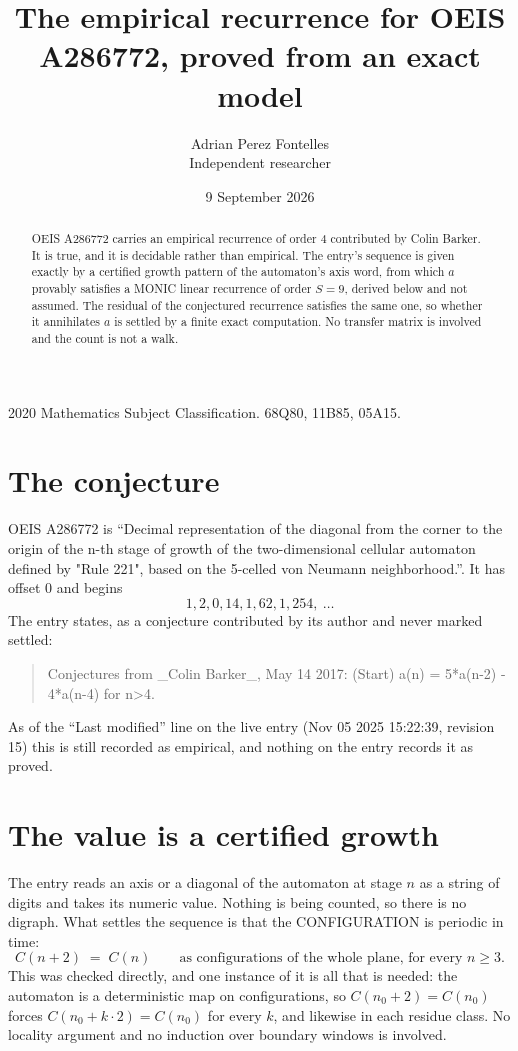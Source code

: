 \documentclass[11pt,a4paper]{article}
\title{The empirical recurrence for OEIS A286772, proved from an exact model}
\author{Adrian Perez Fontelles\\ \small Independent researcher}
\date{9 September 2026}
\theoremstyle{plain}
\theoremstyle{definition}
\begin{document}
\maketitle

\begin{abstract}
OEIS A286772 carries an empirical recurrence of order $4$ contributed by Colin Barker. It is true, and it is
decidable rather than empirical. The entry's sequence is given exactly by a certified growth pattern of the automaton's axis word, from
which $a$ provably satisfies a MONIC linear recurrence of order $S=9$, derived below and not
assumed. The residual of the conjectured recurrence satisfies the same one, so whether it
annihilates $a$ is settled by a finite exact computation. No transfer matrix is involved and
the count is not a walk.
\end{abstract}

\noindent\small 2020 Mathematics Subject Classification. 68Q80, 11B85, 05A15.\normalsize

\section{The conjecture}

OEIS A286772 is ``Decimal representation of the diagonal from the corner to the origin of the n-th stage of growth of the two-dimensional cellular automaton defined by "Rule 221", based on the 5-celled von Neumann neighborhood.''. It has offset $0$ and begins
\[
1, 2, 0, 14, 1, 62, 1, 254,\ \dots
\]
The entry states, as a conjecture contributed by its author and never marked settled:
\begin{quote}
Conjectures from \_Colin Barker\_, May 14 2017: (Start) a(n) = 5*a(n-2) - 4*a(n-4) for n>4.
\end{quote}
As of the ``Last modified'' line on the live entry (Nov 05 2025 15:22:39, revision 15)
this is still recorded as empirical, and nothing on the entry records it as proved.

\section{The value is a certified growth}

The entry reads an axis or a diagonal of the automaton at stage $n$ as a string of digits and
takes its numeric value. Nothing is being counted, so there is no digraph. What settles the
sequence is that the CONFIGURATION is periodic in time:
\[
C(n+2)\;=\;C(n)\qquad\text{as configurations of the whole plane, for every } n\ge 3.
\]
This was checked directly, and one instance of it is all that is needed: the automaton is a
deterministic map on configurations, so $C(n_0+2)=C(n_0)$ forces $C(n_0+k\cdot2)=C(n_0)$ for
every $k$, and likewise in each residue class. No locality argument and no induction over
boundary windows is involved.
\end{document}
